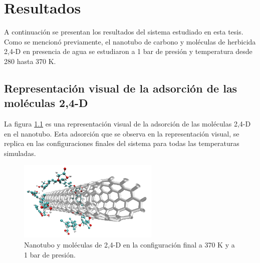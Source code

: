 \chapter{Resultados}

A continuación se presentan los resultados del sistema estudiado en esta tesis. Como se mencionó previamente, el nanotubo de carbono y moléculas de herbicida 2,4-D en presencia de agua se estudiaron a 1 bar de presión y temperatura desde 280 hasta 370 K.



\section{Representación visual de la adsorción de las moléculas 2,4-D}

La figura \ref{fig:Conffinal370} es una representación visual de la adsorción de las moléculas 2,4-D en el nanotubo. Esta adsorción que se observa en la representación visual, se replica en las configuraciones finales del sistema para todas las temperaturas simuladas.

\begin{figure}[!h]
    \centering
    \includegraphics[width=0.6\textwidth,keepaspectratio=true]{resultados/all-new-370K.png}
    \caption{Nanotubo y moléculas de 2,4-D en la configuración final a 370 K y a 1 bar de presión.}
    \label{fig:Conffinal370}
\end{figure}


